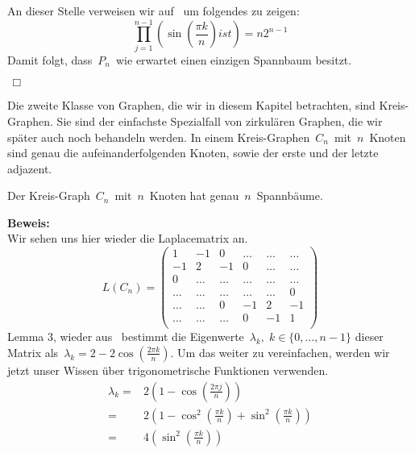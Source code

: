 An dieser Stelle verweisen wir auf~\cite{fiktor_2010} um folgendes zu zeigen:
\begin{equation}
 \prod_{j=1}^{n-1} \left(\sin\left(\frac{\pi k}{n}\right) ist \right)=n2^{n-1}
 \label{fiktor}
\end{equation}
Damit folgt, dass $\,P_n\,$ wie erwartet einen einzigen Spannbaum besitzt.
\begin{flushright} $\,\Box\,$ \end{flushright}
Die zweite Klasse von Graphen, die wir in diesem Kapitel betrachten, sind Kreis-Graphen.
Sie sind der einfachste Spezialfall von zirkulären Graphen, die wir später auch noch behandeln werden. In einem Kreis-Graphen $\,C_n\,$ mit $\,n\,$ Knoten sind genau die aufeinanderfolgenden Knoten, sowie der erste und der letzte adjazent. 
\begin{Lms}
 Der Kreis-Graph $\,C_n\,$ mit $\,n\,$ Knoten hat genau $\,n\,$ Spannbäume.
\end{Lms}
\textbf{Beweis:}\\
Wir sehen uns hier wieder die Laplacematrix an.\\
\begin{equation*}
L(C_n)=
\begin{pmatrix}
1&-1&0&\ldots&\ldots&\ldots\\
-1&2&-1&0&\ldots&\ldots\\
0&\ldots&\ldots&\ldots&\ldots&\ldots\\
\ldots&\ldots&\ldots&\ldots&\ldots&0\\
\ldots&\ldots&0&-1&2&-1\\
\ldots&\ldots&\ldots&0&-1&1\\
\end{pmatrix}
\end{equation*}
Lemma 3, wieder aus~\cite{daoud_2014} bestimmt die Eigenwerte $\,\lambda_k,\; k \in \{0,\ldots,n-1\}$
dieser Matrix als $\,\lambda_k = 2-2\cos {\left(\frac{2\pi k}{n}\right)}$.\; 
Um das weiter zu vereinfachen, werden wir jetzt unser Wissen über trigonometrische Funktionen verwenden.
\begin{equation}
\begin{split}
 \lambda_k={} & 2 \left(1-\cos \left(\frac{2\pi j}{n}\right)\right)\\
 = {}&2 \left( 1 - \cos^2\left(\frac{\pi k}{n}\right)+\sin^2\left(\frac{\pi k}{n}\right) \right)\\
 = {}& 4 \left(\sin^2\left(\frac{\pi k}{n}\right) \right)\\
\end{split}
\label{ewc}
\end{equation}
